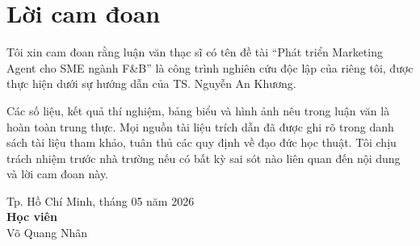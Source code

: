 \cleardoublepage
{}
{}
\chapter*{Lời cam đoan}

Tôi xin cam đoan rằng luận văn thạc sĩ có tên đề tài ``Phát triển Marketing Agent cho SME ngành F\&B'' là công trình nghiên cứu độc lập của riêng tôi, được thực hiện dưới sự hướng dẫn của TS. Nguyễn An Khương.

Các số liệu, kết quả thí nghiệm, bảng biểu và hình ảnh nêu trong luận văn là hoàn toàn trung thực. Mọi nguồn tài liệu trích dẫn đã được ghi rõ trong danh sách tài liệu tham khảo, tuân thủ các quy định về đạo đức học thuật. Tôi chịu trách nhiệm trước nhà trường nếu có bất kỳ sai sót nào liên quan đến nội dung và lời cam đoan này.

\vspace{2em}

\begin{flushright}
\begin{minipage}{0.5\textwidth}
\centering
Tp. Hồ Chí Minh, tháng 05 năm 2026\\[0.5em]
\textbf{Học viên}\\[10em]
Võ Quang Nhân
\end{minipage}
\end{flushright}
